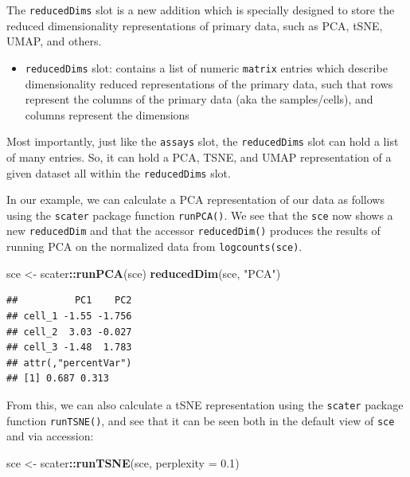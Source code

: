 \documentclass[]{book}
\newenvironment{Shaded}{\begin{snugshade}}{\end{snugshade}}
\newcommand{\DataTypeTok}[1]{\textcolor[rgb]{0.13,0.29,0.53}{#1}}
\newcommand{\FloatTok}[1]{\textcolor[rgb]{0.00,0.00,0.81}{#1}}
\newcommand{\KeywordTok}[1]{\textcolor[rgb]{0.13,0.29,0.53}{\textbf{#1}}}
\newcommand{\NormalTok}[1]{#1}
\newcommand{\OperatorTok}[1]{\textcolor[rgb]{0.81,0.36,0.00}{\textbf{#1}}}
\newcommand{\StringTok}[1]{\textcolor[rgb]{0.31,0.60,0.02}{#1}}
\providecommand{\tightlist}{%
  \setlength{\itemsep}{0pt}\setlength{\parskip}{0pt}}
\begin{document}
The \texttt{reducedDims} slot is a new addition which is specially designed to store the reduced dimensionality representations of primary data, such as PCA, tSNE, UMAP, and others.

\begin{itemize}
\tightlist
\item
  \texttt{reducedDims} slot: contains a list of numeric \texttt{matrix} entries which describe dimensionality reduced representations of the primary data, such that rows represent the columns of the primary data (aka the samples/cells), and columns represent the dimensions
\end{itemize}

Most importantly, just like the \texttt{assays} slot, the \texttt{reducedDims} slot can hold a list of many entries. So, it can hold a PCA, TSNE, and UMAP representation of a given dataset all within the \texttt{reducedDims} slot.

In our example, we can calculate a PCA representation of our data as follows using the \texttt{scater} package function \texttt{runPCA()}. We see that the \texttt{sce} now shows a new \texttt{reducedDim} and that the accessor \texttt{reducedDim()} produces the results of running PCA on the normalized data from \texttt{logcounts(sce)}.

\begin{Shaded}
\begin{Highlighting}[]
\NormalTok{sce <-}\StringTok{ }\NormalTok{scater}\OperatorTok{::}\KeywordTok{runPCA}\NormalTok{(sce)}
\KeywordTok{reducedDim}\NormalTok{(sce, }\StringTok{"PCA"}\NormalTok{)}
\end{Highlighting}
\end{Shaded}

\begin{verbatim}
##          PC1    PC2
## cell_1 -1.55 -1.756
## cell_2  3.03 -0.027
## cell_3 -1.48  1.783
## attr(,"percentVar")
## [1] 0.687 0.313
\end{verbatim}

From this, we can also calculate a tSNE representation using the \texttt{scater} package function \texttt{runTSNE()}, and see that it can be seen both in the default view of \texttt{sce} and via accession:

\begin{Shaded}
\begin{Highlighting}[]
\NormalTok{sce <-}\StringTok{ }\NormalTok{scater}\OperatorTok{::}\KeywordTok{runTSNE}\NormalTok{(sce, }\DataTypeTok{perplexity =} \FloatTok{0.1}\NormalTok{)}
\end{Highlighting}
\end{Shaded}
\end{document}
